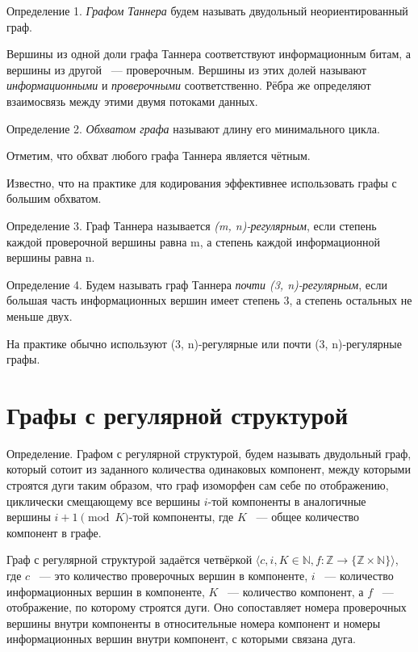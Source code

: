 \documentclass[14pt]{mmcs_article}
\begin{document}
Определение 1. \textsl{Графом Таннера} будем называть двудольный неориентированный граф.

Вершины из одной доли графа Таннера соответствуют информационным битам, а вершины из другой ~--- проверочным. Вершины из этих долей называют \textsl{информационными} и \textsl{проверочными} соответственно. Рёбра же определяют взаимосвязь между этими двумя потоками данных.

Определение 2. \textsl{Обхватом графа} называют длину его минимального цикла.

Отметим, что обхват любого графа Таннера является чётным.

Известно, что на практике для кодирования эффективнее использовать графы с большим обхватом.

Определение 3. Граф Таннера называется \textsl{(m, n)-регулярным}, если степень каждой проверочной вершины равна m, а степень каждой информационной вершины равна n.

Определение 4. Будем называть граф Таннера \textsl{почти (3, n)-регулярным}, если большая часть информационных вершин имеет степень 3, а степень остальных не меньше двух.

На практике обычно используют (3, n)-регулярные или почти (3, n)-регулярные графы.

\newpage
\section{Графы с регулярной структурой}

Определение. Графом с регулярной структурой, будем называть двудольный граф, который сотоит из заданного количества одинаковых компонент, между которыми строятся дуги таким образом, что граф изоморфен сам себе по отображению, циклически смещающему все вершины $i$-той компоненты в аналогичные вершины $i + 1 \pmod K$-той компоненты, где $K$ ~--- общее количество компонент в графе.

Граф с регулярной структурой задаётся четвёркой $\langle c, i, K \in \mathbb{N}, f: \mathbb{Z} \rightarrow \{ \mathbb{Z} \times \mathbb{N} \} \rangle$, где $c$ ~--- это количество проверочных вершин в компоненте, $i$ ~--- количество информационных вершин в компоненте, $K$ ~--- количество компонент, а $f$ ~--- отображение, по которому строятся дуги. Оно сопоставляет номера проверочных вершины внутри компоненты в относительные номера компонент и номеры информационных вершин внутри компонент, с которыми связана дуга.
\end{document}
